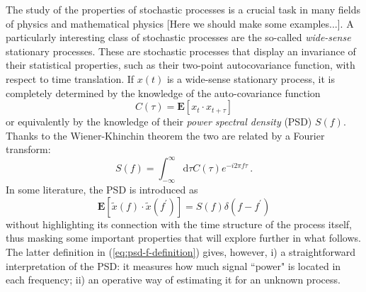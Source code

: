 \documentclass[twocolumn,showpacs,preprintnumbers,nofootinbib,prd,
superscriptaddress,10pt]{revtex4-1}
\begin{document}
The study of the properties of  stochastic processes is a crucial task in many fields of physics and mathematical physics [Here we should make some examples...].
A particularly interesting class of stochastic processes are the so-called \textit{wide-sense} stationary processes. These are stochastic processes that display an invariance of their statistical properties, such as their two-point autocovariance function, with respect to time translation. If $x(t)$ is a wide-sense stationary process, it is completely determined by the knowledge of the auto-covariance function 
\begin{equation}
	C(\tau) = \mathbf{E}[x_t \cdot x_{t+\tau}]
\end{equation}
or equivalently by the knowledge of their \emph{power spectral density} (PSD) $S(f)$. Thanks to the Wiener-Khinchin theorem the two are related by a Fourier transform: 
\begin{equation}
	S(f) = \int_{-\infty}^{\infty} \textrm{d}\tau C(\tau) e^{-i 2 \pi f \tau}\,.
\end{equation}
In some literature, the PSD is introduced as  
\begin{equation}\label{eq:psd-f-definition}
	\mathbf{E}[\tilde{x}(f) \cdot \tilde{x}(f^\prime)] = S(f) \delta(f-f^\prime)
\end{equation}
without highlighting its connection with the time structure of the process itself, thus masking some important properties that will explore further in what follows. The latter definition in (\ref{eq:psd-f-definition}) gives, however, i) a straightforward interpretation of the PSD: it measures how much signal ``power" is located in each frequency; ii) an operative way of estimating it for an unknown process.  
\end{document}
